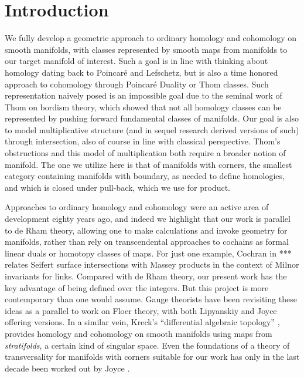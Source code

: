 
\section{Introduction}\label{intro}

We fully develop a geometric approach to ordinary homology and cohomology on smooth manifolds, with classes represented by smooth maps from manifolds to our target manifold of interest.
Such a goal is in line with thinking about homology dating back to Poincar\'e and Lefschetz, but is also a time honored approach to cohomology through Poincar\'e Duality or Thom classes.
Such representation naively posed is an impossible goal due to the seminal work of Thom on bordism theory,
which showed that not all homology classes can be represented by pushing forward fundamental classes of manifolds.
Our goal is also to model multiplicative structure (and in sequel research derived versions of such) through intersection, also of course in line with classical perspective.
Thom's obstructions and this model of multiplication both require a broader notion of manifold.
The one we utilize here is that of manifolds with corners, the smallest category containing manifolds with boundary, as needed to define homologies, and which is closed under pull-back, which we use for product.

Approaches to ordinary homology and cohomology were an active area of development eighty years ago, and indeed we highlight that our work is parallel to de Rham theory, allowing one to make calculations and invoke geometry for manifolds, rather than rely on transcendental approaches to cochains as formal linear duals or homotopy classes of maps.
For just one example, Cochran in *** relates Seifert surface intersections with
Massey products in the context of Milnor invariants for links.
Compared with de Rham theory, our present work has the key advantage of being defined over the integers.
But this project is more contemporary than one would assume.
Gauge theorists
have been revisiting these ideas as a parallel to work on Floer theory, with both Lipyanskiy \cite{Lipy14} and Joyce \cite{Joyc15} offering versions.
In a similar vein, Kreck's ``differential algebraic topology'' \cite{Krec10}, provides homology and cohomology on smooth manifolds using maps from \textit{stratifolds}, a certain kind of singular space.
Even the foundations of a theory of transversality for manifolds with corners suitable for our work
has only in the last decade been worked out by Joyce \cite{Joy12}.

